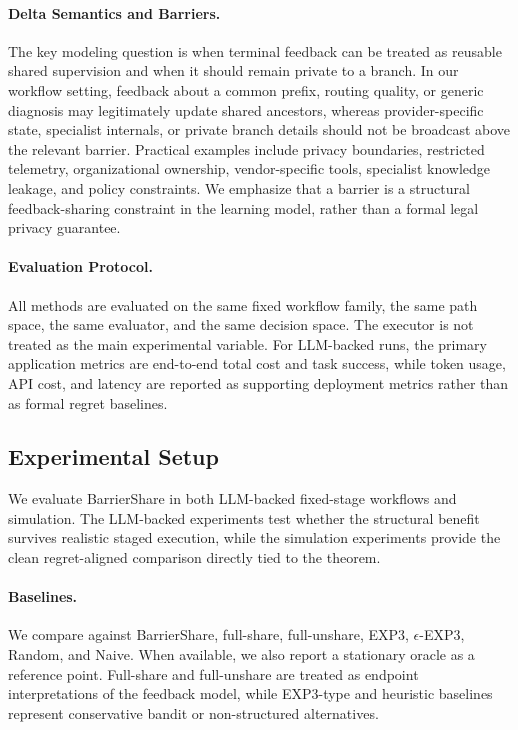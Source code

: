 \documentclass{article}
\begin{document}
\paragraph{Delta Semantics and Barriers.}
The key modeling question is when terminal feedback can be treated as reusable shared supervision and when it should remain private to a branch. In our workflow setting, feedback about a common prefix, routing quality, or generic diagnosis may legitimately update shared ancestors, whereas provider-specific state, specialist internals, or private branch details should not be broadcast above the relevant barrier. Practical examples include privacy boundaries, restricted telemetry, organizational ownership, vendor-specific tools, specialist knowledge leakage, and policy constraints. We emphasize that a barrier is a structural feedback-sharing constraint in the learning model, rather than a formal legal privacy guarantee.

\paragraph{Evaluation Protocol.}
All methods are evaluated on the same fixed workflow family, the same path space, the same evaluator, and the same decision space. The executor is not treated as the main experimental variable. For LLM-backed runs, the primary application metrics are end-to-end total cost and task success, while token usage, API cost, and latency are reported as supporting deployment metrics rather than as formal regret baselines.

\subsection{Experimental Setup}

We evaluate BarrierShare in both LLM-backed fixed-stage workflows and simulation. The LLM-backed experiments test whether the structural benefit survives realistic staged execution, while the simulation experiments provide the clean regret-aligned comparison directly tied to the theorem.

\paragraph{Baselines.}
We compare against BarrierShare, full-share, full-unshare, EXP3, $\epsilon$-EXP3, Random, and Naive. When available, we also report a stationary oracle as a reference point. Full-share and full-unshare are treated as endpoint interpretations of the feedback model, while EXP3-type and heuristic baselines represent conservative bandit or non-structured alternatives.
\end{document}
